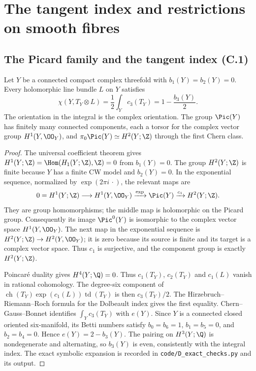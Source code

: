 \section{The tangent index and restrictions on smooth fibres}

\subsection{The Picard family and the tangent index (C.1)}

\begin{proposition}[C.1.1; Proved]\label{st:C.1.1}
Let $Y$ be a connected compact complex threefold with
$b_1(Y)=b_2(Y)=0$. Every holomorphic line bundle $L$ on $Y$ satisfies
\[
 \chi(Y,T_Y\otimes L)=\frac12\int_Yc_3(T_Y)
 =1-\frac{b_3(Y)}2.
\]
The orientation in the integral is the complex orientation. The group
$\Pic(Y)$ has finitely many connected components, each a torsor for the
complex vector group $H^1(Y,\OO_Y)$, and
$\pi_0\Pic(Y)\simeq H^2(Y;\Z)$ through the first Chern class.
\end{proposition}
\begin{proof}
The universal coefficient theorem gives
$H^1(Y;\Z)=\Hom(H_1(Y;\Z),\Z)=0$ from $b_1(Y)=0$.
The group $H^2(Y;\Z)$ is finite because $Y$ has a finite CW model and
$b_2(Y)=0$. In the exponential sequence, normalized by
$\exp(2\pi i\,\cdot)$, the relevant maps are
\[
0=H^1(Y;\Z)\longrightarrow H^1(Y,\OO_Y)
 \xrightarrow{\exp} \Pic(Y)
 \xrightarrow{c_1} H^2(Y;\Z).
\]
They are group homomorphisms; the middle map is holomorphic on the
Picard group. Consequently its image $\Pic^0(Y)$ is isomorphic to the
complex vector space $H^1(Y,\OO_Y)$. The next map in the exponential
sequence is $H^2(Y;\Z)\to H^2(Y,\OO_Y)$; it is zero because its
source is finite and its target is a complex vector space. Thus
$c_1$ is surjective, and the component group is exactly $H^2(Y;\Z)$.

Poincar\'e duality gives $H^4(Y;\Q)=0$. Thus
$c_1(T_Y)$, $c_2(T_Y)$ and $c_1(L)$ vanish in rational cohomology.
The degree-six component of
$\operatorname{ch}(T_Y)\exp(c_1(L))\operatorname{td}(T_Y)$ is then
$c_3(T_Y)/2$. The Hirzebruch--Riemann--Roch formula for the Dolbeault
index gives the first equality. Chern--Gauss--Bonnet identifies
$\int_Yc_3(T_Y)$ with $e(Y)$. Since $Y$ is a connected closed oriented
six-manifold, its Betti numbers satisfy
$b_0=b_6=1$, $b_1=b_5=0$, and $b_2=b_4=0$. Hence
$e(Y)=2-b_3(Y)$. The pairing on $H^3(Y;\Q)$ is nondegenerate and
alternating, so $b_3(Y)$ is even, consistently with the integral index.
The exact symbolic expansion is recorded in
\texttt{code/D\_exact\_checks.py} and its output.
\end{proof}

